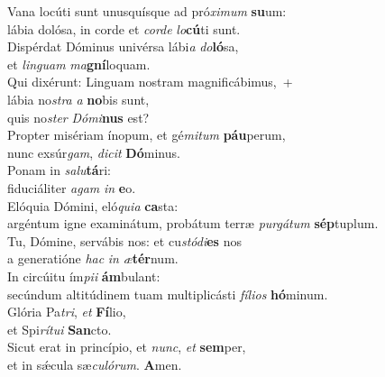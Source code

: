 \evenverse Vana locúti sunt unusquísque ad pró\textit{xi}\textit{mum} \textbf{su}um:~\*\\
\evenverse lábia dolósa, in corde et \textit{cor}\textit{de} \textit{lo}\textbf{cú}ti sunt.\\
\oddverse Dispérdat Dóminus univérsa lábi\textit{a} \textit{do}\textbf{ló}sa,~\*\\
\oddverse et \textit{lin}\textit{guam} \textit{ma}\textbf{gní}loquam.\\
\evenverse Qui dixérunt: Linguam nostram magnificábimus,~+\\
\evenverse  lábia no\textit{stra} \textit{a} \textbf{no}bis sunt,~\*\\
\evenverse quis no\textit{ster} \textit{Dó}\textit{mi}\textbf{nus} est?\\
\oddverse Propter misériam ínopum, et gé\textit{mi}\textit{tum} \textbf{páu}perum,~\*\\
\oddverse nunc exsúr\textit{gam}, \textit{di}\textit{cit} \textbf{Dó}minus.\\
\evenverse Ponam in \textit{sa}\textit{lu}\textbf{tá}ri:~\*\\
\evenverse fiduciáliter \textit{a}\textit{gam} \textit{in} \textbf{e}o.\\
\oddverse Elóquia Dómini, eló\textit{qui}\textit{a} \textbf{ca}sta:~\*\\
\oddverse argéntum igne examinátum, probátum terræ \textit{pur}\textit{gá}\textit{tum} \textbf{sép}tuplum.\\
\evenverse Tu, Dómine, servábis nos: et cu\textit{stó}\textit{di}\textbf{es} nos~\*\\
\evenverse a generatióne \textit{hac} \textit{in} \textit{æ}\textbf{tér}num.\\
\oddverse In circúitu ím\textit{pi}\textit{i} \textbf{ám}bulant:~\*\\
\oddverse secúndum altitúdinem tuam multiplicásti \textit{fí}\textit{li}\textit{os} \textbf{hó}minum.\\
\evenverse Glória Pa\textit{tri}, \textit{et} \textbf{Fí}lio,~\*\\
\evenverse et Spi\textit{rí}\textit{tu}\textit{i} \textbf{San}cto.\\
\oddverse Sicut erat in princípio, et \textit{nunc}, \textit{et} \textbf{sem}per,~\*\\
\oddverse et in sǽcula sæ\textit{cu}\textit{ló}\textit{rum}. \textbf{A}men.\\
